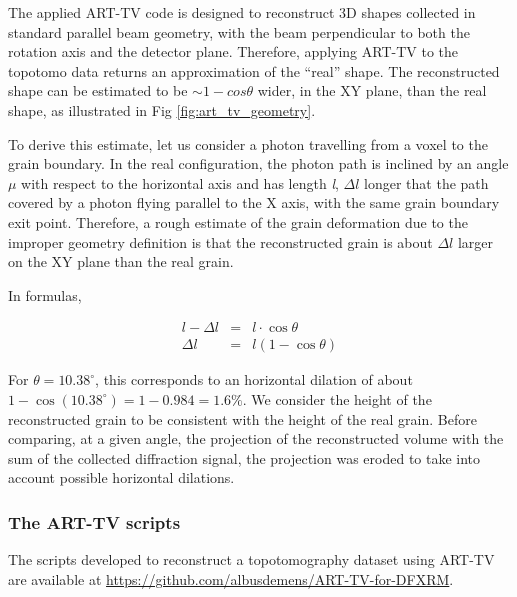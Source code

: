 \documentclass[11pt]{scrartcl}
\begin{document}
The applied {\footnotesize{ART-TV}} code is designed to reconstruct {\footnotesize{3D}} shapes collected in standard parallel beam geometry, with the beam perpendicular to both the rotation axis and the detector plane. Therefore, applying {\footnotesize{ART-TV}} to the topotomo data returns an approximation of the ``real'' shape. The reconstructed shape can be estimated to be $\sim 1 - cos\theta$ wider, in the {\footnotesize{XY}} plane, than the real shape, as illustrated in Fig \ref{fig:art_tv_geometry}. 

To derive this estimate, let us consider a photon travelling from a voxel to the grain boundary. In the real configuration, the photon path is inclined by an angle $\mu$ with respect to the horizontal axis and has length {\emph{l}}, $\Delta l$ longer that the path covered by a photon flying parallel to the {\footnotesize{X}} axis, with the same grain boundary exit point. Therefore, a rough estimate of the grain deformation due to the improper geometry definition is that the reconstructed grain is about $\Delta l$ larger on the {\footnotesize{XY}} plane than the real grain.

In formulas, 

\begin{eqnarray}
    l - \Delta l & = & l\cdot\cos\theta \\
    \Delta l & = & l (1 - \cos\theta) 
\end{eqnarray}

For $\theta = 10.38^{\circ}$, this corresponds to an horizontal dilation of about $ 1 - \cos(10.38^{\circ}) = 1 - 0.984 = 1.6 \%$. We consider the height of the reconstructed grain to be consistent with the height of the real grain. Before comparing, at a given angle, the projection of the reconstructed volume with the sum of the collected diffraction signal, the projection was eroded to take into account possible horizontal dilations. 

\subsubsection{The ART-TV scripts}

The scripts developed to reconstruct a topotomography dataset using {\footnotesize{ART-TV}} are available at \url{https://github.com/albusdemens/ART-TV-for-DFXRM}.
\end{document}
